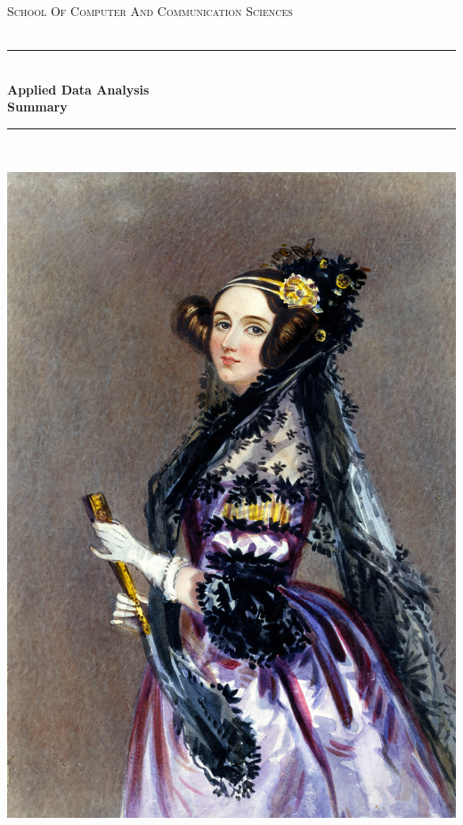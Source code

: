 \documentclass[a4paper,11pt,twoside]{article}
\begin{document}
\begin{titlepage} %
\begin{center}
\newcommand{\HRule}{\rule{\linewidth}{0.5mm}} %
\center %
 
 




\begin{figure} [h] %
\centerline{
} 
\end{figure}


\vspace{0.5cm}
\textsc{\Large School Of Computer And Communication Sciences}\\[0.5cm] %
\textsc{\Large }\\%


\HRule \\[0.4cm]
{ \huge \bfseries Applied Data Analysis \\Summary}\\[0.4cm] %
\HRule \\[1.5cm]

\begin{center}
\includegraphics[width = 5 cm]{pic/lovelace} %
\end{center}




\end{center}
\end{titlepage}
\end{document}
